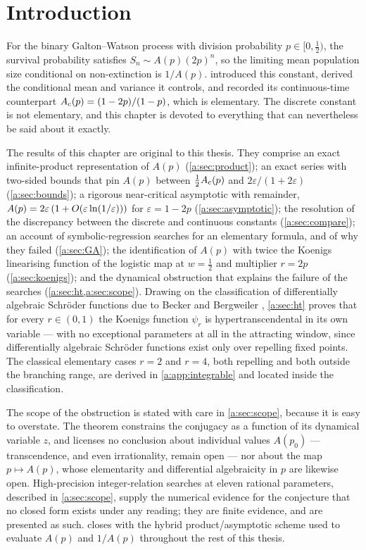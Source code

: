 \section{Introduction}
\label{a:sec:intro}

For the binary Galton--Watson process with division probability
$p\in[0,\tfrac12)$, the survival probability satisfies
$S_n\sim A(p)(2p)^n$, so the limiting mean population size conditional on
non-extinction is $1/A(p)$. \ChM{} introduced this constant, derived the
conditional mean and variance it controls, and recorded its continuous-time
counterpart $A_{\mathrm{c}}(p)=(1-2p)/(1-p)$, which is elementary. The discrete constant is
not elementary, and this chapter is devoted to everything that can nevertheless be
said about it exactly.

The results of this chapter are original to this thesis. They comprise an exact
infinite-product representation of $A(p)$ (\cref{a:sec:product}); an exact series
with two-sided bounds that pin $A(p)$ between $\tfrac12A_{\mathrm{c}}(p)$ and
$2\varepsilon/(1+2\varepsilon)$ (\cref{a:sec:bounds}); a rigorous near-critical
asymptotic with remainder, $A(p)=2\varepsilon\left(1+O(\varepsilon\ln(1/\varepsilon))\right)$
for $\varepsilon=1-2p$ (\cref{a:sec:asymptotic}); the resolution of the
discrepancy between the discrete and continuous constants
(\cref{a:sec:compare}); an account of symbolic-regression searches for an
elementary formula, and of why they failed (\cref{a:sec:GA}); the identification
of $A(p)$ with twice the Koenigs linearising function of the logistic map at
$w=\tfrac12$ and multiplier $r=2p$ (\cref{a:sec:koenigs}); and the dynamical
obstruction that explains the failure of the searches
(\cref{a:sec:ht,a:sec:scope}). Drawing on the classification of differentially
algebraic Schr\"oder functions due to Becker and Bergweiler
\cite{Becker1995}, \cref{a:sec:ht} proves that for every $r\in(0,1)$ the Koenigs
function $\psi_r$ is hypertranscendental in its own variable --- with no
exceptional parameters at all in the attracting window, since differentially
algebraic Schr\"oder functions exist only over repelling fixed points. The
classical elementary cases $r=2$ and $r=4$, both repelling and both outside the
branching range, are derived in \cref{a:app:integrable} and located inside the
classification.

The scope of the obstruction is stated with care in \cref{a:sec:scope}, because
it is easy to overstate. The theorem constrains the conjugacy as a function of its
dynamical variable $z$, and licenses no conclusion about individual values
$A(p_0)$ --- transcendence, and even irrationality, remain open --- nor about the
map $p\mapsto A(p)$, whose elementarity and differential algebraicity in $p$ are
likewise open. High-precision integer-relation searches at eleven rational
parameters, described in \cref{a:sec:scope}, supply the numerical evidence for the
conjecture that no closed form exists under any reading; they are finite evidence,
and are presented as such.  closes with the hybrid
product/asymptotic scheme used to evaluate $A(p)$ and $1/A(p)$ throughout the rest
of this thesis.
